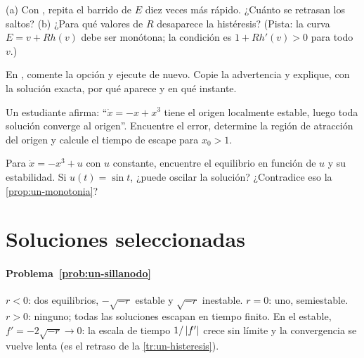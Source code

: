 \begin{problema}[histéresis]\label{prob:un-histeresis}
\etiquetaM{} (a) Con , repita el barrido de $E$ diez veces más rápido. ¿Cuánto se retrasan los saltos? (b) ¿Para qué valores de $R$ desaparece la histéresis? (Pista: la curva $E=v+Rh(v)$ debe ser monótona; la condición es $1+Rh'(v)>0$ para todo $v$.)
\end{problema}

\begin{problema}\label{prob:un-advertencia}
\etiquetaM{} En , comente la opción  y ejecute de nuevo. Copie la advertencia y explique, con la solución exacta, por qué aparece y en qué instante.
\end{problema}

\begin{problema}\label{prob:un-trampa}
Un estudiante afirma: ``$\dot x=-x+x^3$ tiene el origen localmente estable, luego toda solución converge al origen''. Encuentre el error, determine la región de atracción del origen y calcule el tiempo de escape para $x_0>1$.
\end{problema}

\begin{problema}\label{prob:un-entrada}
\etiquetaEstrella{} Para $\dot x=-x^3+u$ con $u$ constante, encuentre el equilibrio en función de $u$ y su estabilidad. Si $u(t)=\sin t$, ¿puede oscilar la solución? ¿Contradice eso la \cref{prop:un-monotonia}?
\end{problema}

\section{Soluciones seleccionadas}

\paragraph{Problema~\ref{prob:un-sillanodo}}
$r<0$: dos equilibrios, $-\sqrt{-r}$ estable y $\sqrt{-r}$ inestable. $r=0$: uno, semiestable. $r>0$: ninguno; todas las soluciones escapan en tiempo finito. En el estable, $f'=-2\sqrt{-r}\to0$: la escala de tiempo $1/\left\lvert f'\right\rvert$ crece sin límite y la convergencia se vuelve lenta (es el retraso de la \cref{tr:un-histeresis}).

